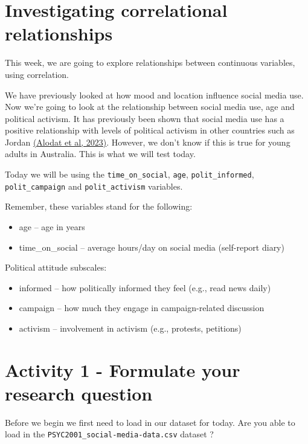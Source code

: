 \documentclass[
]{book}
\providecommand{\tightlist}{%
  \setlength{\itemsep}{0pt}\setlength{\parskip}{0pt}}
\begin{document}
\section{Investigating correlational relationships}\label{investigating-correlational-relationships}

This week, we are going to explore relationships between continuous variables, using correlation.

We have previously looked at how mood and location influence social media use. Now we're going to look at the relationship between social media use, age and political activism. It has previously been shown that social media use has a positive relationship with levels of political activism in other countries such as Jordan \href{https://www.mdpi.com/2076-0760/12/7/402}{(Alodat et al, 2023)}. However, we don't know if this is true for young adults in Australia. This is what we will test today.

Today we will be using the \texttt{time\_on\_social}, \texttt{age}, \texttt{polit\_informed}, \texttt{polit\_campaign} and \texttt{polit\_activism} variables.

Remember, these variables stand for the following:

\begin{itemize}
\tightlist
\item
  age -- age in years
\item
  time\_on\_social -- average hours/day on social media (self-report diary)
\end{itemize}

Political attitude subscales:

\begin{itemize}
\tightlist
\item
  informed -- how politically informed they feel (e.g., read news daily)
\item
  campaign -- how much they engage in campaign-related discussion
\item
  activism -- involvement in activism (e.g., protests, petitions)
\end{itemize}

\section{Activity 1 - Formulate your research question}\label{activity-1---formulate-your-research-question-1}

Before we begin we first need to load in our dataset for today. Are you able to load in the \texttt{PSYC2001\_social-media-data.csv} dataset ?
\end{document}

